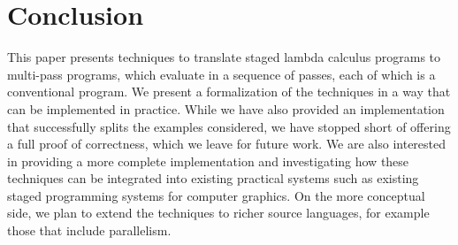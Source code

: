\section{Conclusion}

This paper presents techniques to translate staged lambda calculus
programs to multi-pass programs, which evaluate in a sequence of
passes, each of which is a conventional program.  We present a
formalization of the techniques in a way that can be implemented in
practice.  While we have also provided an implementation that
successfully splits the examples considered, we have stopped short of
offering a full proof of correctness, which we leave for future work.
We are also interested in providing a more complete implementation and
investigating how these techniques can be integrated into existing
practical systems such as existing staged programming systems for
computer graphics.  On the more conceptual side, we plan to extend the
techniques to richer source languages, for example those that include
parallelism.

